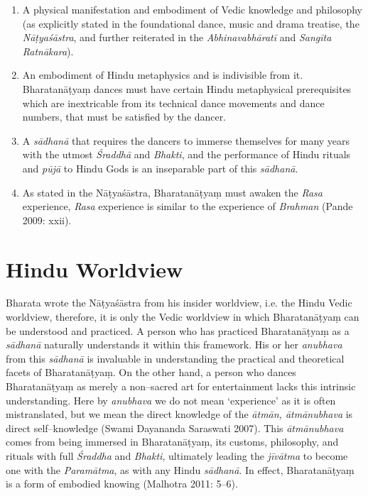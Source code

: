 \begin{enumerate}[{\rm 1)}]
\itemsep=0pt
\item A physical manifestation and embodiment of Vedic knowledge and philosophy (as explicitly stated in the foundational dance, music and drama treatise, the \textit{Nāṭyaśāstra}, and further reiterated in the \textit{Abhinavabhāratī} and \textit{Sangīta Ratnākara}).

 \item An embodiment of Hindu metaphysics and is indivisible from it. Bharatanāṭyaṃ dances must have certain Hindu metaphysical prerequisites which are inextricable from its technical dance movements and dance numbers, that must be satisfied by the dancer.

 \item A \textit{sādhanā} that requires the dancers to immerse themselves for many years with the utmost \textit{Śraddhā} and \textit{Bhakti}, and the performance of Hindu rituals and \textit{pūjā} to Hindu Gods is an inseparable part of this \textit{sādhanā}.

 \item As stated in the Nāṭyaśāstra, Bharatanāṭyaṃ must awaken the \textit{Rasa} experience, \textit{Rasa} experience is similar to the experience of \textit{Brahman} (Pande 2009: xxii).

\end{enumerate}


\section*{Hindu Worldview}

Bharata wrote the Nāṭyaśāstra from his insider worldview, i.e. the Hindu Vedic worldview, therefore, it is only the Vedic worldview in which Bharatanāṭyaṃ can be understood and practiced. A person who has practiced Bharatanāṭyaṃ as a \textit{sādhanā }naturally understands it within this framework. His or her \textit{anubhava }from this\textit{ sādhanā }is invaluable in understanding the practical and theoretical facets of Bharatanāṭyaṃ. On the other hand, a person who dances Bharatanāṭyaṃ as merely a non–sacred art for entertainment lacks this intrinsic understanding. Here by \textit{anubhava} we do not mean ‘experience’ as it is often mistranslated, but we mean the direct knowledge of the \textit{ātmān, ātmānubhava }is direct self–knowledge (Swami Dayananda Saraswati 2007). This \textit{ātmānubhava} comes from being immersed in Bharatanāṭyaṃ, its customs, philosophy, and rituals with full \textit{Śraddha} and \textit{Bhakti}, ultimately leading the \textit{jīvātma} to become one with the \textit{Paramātma}, as with any Hindu \textit{sādhanā}. In effect, Bharatanāṭyaṃ is a form of embodied knowing (Malhotra 2011: 5–6).

